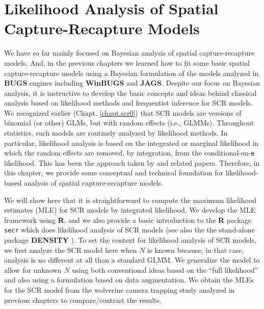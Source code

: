 \chapter{
Likelihood Analysis of Spatial Capture-Recapture Models
}
\label{chapt.mle}

\vspace{.3in}

We have so far mainly focused on Bayesian analysis of spatial
capture-recapture models. And, in the previous chapters we learned how
to fit some basic spatial capture-recapture models using a Bayesian
formulation of the models analyzed in {\bf BUGS} engines including {\bf
  WinBUGS} and {\bf JAGS}.  Despite our focus on Bayesian analysis, it
is instructive to develop the basic concepts and ideas behind
classical analysis based on likelihood methods and frequentist
inference for SCR models. 
We recognized earlier (Chapt. \ref{chapt.scr0}) that SCR
models are versions of binomial (or other) GLMs, but with random
effects (i.e., GLMMs). 
Throughout statistics, such models 
are routinely analyzed by
likelihood methods. In particular, likelihood analysis is based on the
integrated or marginal likelihood in which the random effects are removed, by
integration, from the conditional-on-${\bf s}$ likelihood. 
This has been the approach taken by
\citet{borchers_efford:2008, dawson_efford:2009} and related papers.
Therefore, in this chapter, we provide some conceptual and technical
foundation for likelihood-based analysis of spatial capture-recapture
models. 



We will show here that it is straightforward to compute the maximum
likelihood estimates (MLE) for SCR models by integrated 
likelihood. We develop the MLE framework using {\bf R}, and we also
provide a basic introduction to the {\bf R} package \mbox{\tt secr}
\citep{efford:2011} which does likelihood analysis of SCR
models (see also the the stand-alone package {\bf DENSITY}
\citep{efford_etal:2004}).  To set the context for likelihood analysis
of SCR models, we first analyze the SCR model here when $N$ is known
because, in that case, analysis is no different at all than a standard
GLMM.
We generalize the model to allow for unknown $N$
using both conventional ideas based on the ``full likelihood''
\citep[e.g.,][]{borchers_etal:2002} and also using a formulation based
on data augmentation.  We obtain the MLEs for the SCR model from the
wolverine camera trapping study \citep{magoun_etal:2011} analyzed in
previous chapters to compare/contrast the results.

